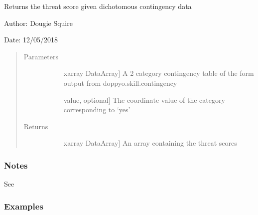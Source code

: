 \documentclass[letterpaper,10pt,english]{sphinxmanual}
\begin{document}

\begin{fulllineitems}
\label{\detokenize{skill_doc:skill.threat_score}}
Returns the threat score given dichotomous contingency data

\begin{DUlineblock}{0em}
\item[] Author: Dougie Squire
\item[] Date: 12/05/2018
\end{DUlineblock}
\begin{quote}\begin{description}
\item[{Parameters}] \leavevmode\begin{description}
\item[{}] \leavevmode{[}xarray DataArray{]}
A 2 category contingency table of the form output from doppyo.skill.contingency

\item[{}] \leavevmode{[}value, optional{]}
The coordinate value of the category corresponding to ‘yes’

\end{description}

\item[{Returns}] \leavevmode\begin{description}
\item[{}] \leavevmode{[}xarray DataArray{]}
An array containing the threat scores

\end{description}

\end{description}\end{quote}
\subsubsection*{Notes}

See 
\subsubsection*{Examples}


\end{fulllineitems}
\end{document}
